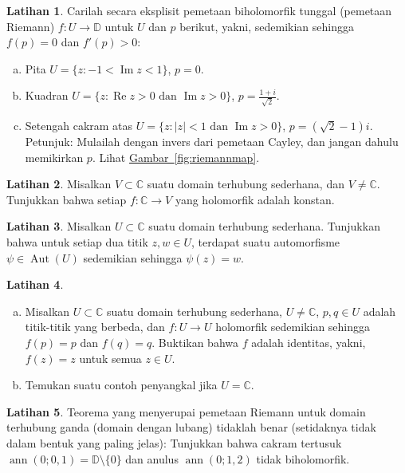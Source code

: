 \documentclass[12pt,openany]{book}
\newcommand{\ann}{\operatorname{ann}}
\renewcommand{\Re}{\operatorname{Re}}
\renewcommand{\Im}{\operatorname{Im}}
\newcommand{\Aut}{\operatorname{Aut}}
\newcommand{\sabs}[1]{\lvert {#1} \rvert}
\newcommand{\C}{{\mathbb{C}}}
\newcommand{\D}{{\mathbb{D}}}
\theoremstyle{plain}
\theoremstyle{remark}
\theoremstyle{definition}
\newenvironment{exbox}{%
    \def\FrameCommand{\vrule width 1pt \relax\hspace{10pt}}%
    \MakeFramed{\advance\hsize-\width\FrameRestore}%
}{%
    \endMakeFramed
}
\newenvironment{exparts}{%
    \leavevmode\begin{enumerate}[a),noitemsep,topsep=0pt,parsep=0pt,partopsep=0pt]
}{%
    \end{enumerate}
}
\theoremstyle{exercise}
\newtheorem{exercise}{Latihan}[section]
\theoremstyle{example}
\newcommand{\figureref}[1]{\hyperref[#1]{Gambar~\ref*{#1}}}
\begin{document}
\begin{exbox}
\begin{exercise} \label{exercise:explicitriemann}
Carilah secara eksplisit pemetaan biholomorfik tunggal (pemetaan Riemann)
$f \colon U \to \D$
untuk $U$ dan $p$ berikut, yakni,
sedemikian sehingga $f(p) = 0$ dan $f'(p) > 0$:
\begin{exparts}
\item
Pita $U = \{ z : -1 < \Im z < 1 \}$, $p=0$.
\item
Kuadran $U = \{ z : \Re z > 0 \text{ dan } \Im z > 0 \}$,
$p=\frac{1+i}{\sqrt{2}}$.
\item
Setengah cakram atas $U = \{ z : \sabs{z} < 1 \text{ dan } \Im z > 0 \}$, $p
= (\sqrt{2}-1)i$.  Petunjuk: Mulailah dengan invers dari pemetaan Cayley, dan
jangan dahulu memikirkan $p$.  Lihat \figureref{fig:riemannmap}.
\end{exparts}
\end{exercise}

\begin{exercise}
Misalkan $V \subset \C$ suatu domain terhubung sederhana, dan $V \neq \C$.
Tunjukkan bahwa setiap $f \colon \C \to V$ yang holomorfik adalah konstan.
\end{exercise}

\begin{exercise}
Misalkan $U \subset \C$ suatu domain terhubung sederhana.
Tunjukkan bahwa untuk setiap dua titik $z,w \in U$, terdapat suatu automorfisme
$\psi \in \Aut(U)$ sedemikian sehingga $\psi(z) = w$.
\end{exercise}

\begin{exercise}
\begin{exparts}
\item
Misalkan $U \subset \C$ suatu domain terhubung sederhana, $U \neq \C$,
$p,q \in U$ adalah titik-titik yang berbeda, dan
$f \colon U \to U$ holomorfik sedemikian sehingga $f(p) = p$ dan $f(q)=q$.
Buktikan bahwa $f$ adalah identitas, yakni, $f(z)=z$ untuk semua $z \in U$.
\item
Temukan suatu contoh penyangkal jika $U=\C$.
\end{exparts}
\end{exercise}

\begin{exercise}
Teorema yang menyerupai pemetaan Riemann untuk domain terhubung ganda (domain dengan
lubang) tidaklah benar
(setidaknya tidak dalam bentuk yang paling jelas):
Tunjukkan bahwa cakram tertusuk $\ann(0;0,1) = \D \setminus \{ 0 \}$
dan anulus $\ann(0;1,2)$ tidak biholomorfik.
\end{exercise}


\end{exbox}
\end{document}
